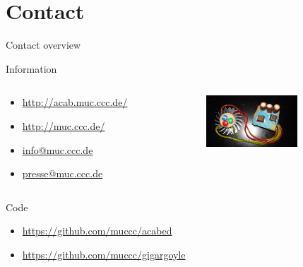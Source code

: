 \documentclass{beamer}
\begin{document}
\section{Contact}
\begin{frame}{Contact overview}
  \begin{block}{Information}
    \begin{columns}
      \begin{column}{6.5cm}
        \begin{itemize}
        \item \url{http://acab.muc.ccc.de/}
        \item \url{http://muc.ccc.de/}
        \item \url{info@muc.ccc.de}
        \item \url{presse@muc.ccc.de}
        \end{itemize}
      \end{column}
      \begin{column}{4cm}
        \includegraphics[width=3.4cm, clip, trim 2cm 0 2cm 0]{bilder/kekslampe.JPG}
      \end{column}
    \end{columns}
  \end{block}
  \begin{block}{Code}
    \begin{itemize}
      \item \url{https://github.com/muccc/acabed}
      \item \url{https://github.com/muccc/gigargoyle}
    \end{itemize}
  \end{block}
\end{frame}
\end{document}
